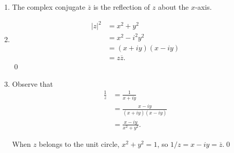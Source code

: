 \documentclass[oneside]{article}
\newcommand\abs[1]{\left|#1\right|}
\begin{document}
  \begin{enumerate}[label=\textbf{(\alph*)}]
    \item The complex conjugate $\overline{z}$ is the reflection of $z$ about
      the $x$-axis.

    \item \begin{align*}
        \abs{z}^2 &= x^2 + y^2 \\
                  &= x^2 - i^2y^2 \\
                  &= (x + iy)(x - iy) \\
                  &= z\overline{z}\text{.}
      \end{align*}
      \qed

    \item
      Observe that \begin{align*}
        \frac{1}{z} &= \frac{1}{x + iy} \\
         &= \frac{x - iy}{(x + iy)(x - iy)} \\
         &= \frac{x - iy}{x^2 + y^2} \text{.}
      \end{align*}

      When $z$ belongs to the unit circle, $x^2 + y^2 = 1$, so
      $1/z = x - iy = \overline{z}$.\qed

  \end{enumerate}
\end{document}
